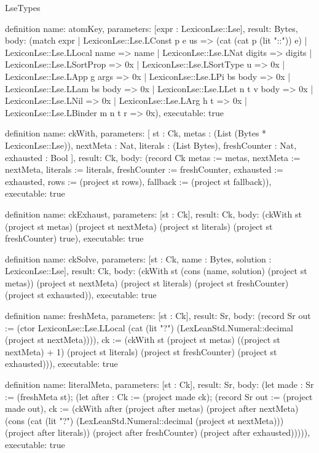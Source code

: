 \begin{lexlean}{LseTypes}
\begin{semanticmodule}
definition{
  name: atomKey,
  parameters: [expr : LexiconLse::Lse],
  result: Bytes,
  body: (match expr
    | LexiconLse::Lse.LConst p e us => (cat (cat p (lit "::")) e)
    | LexiconLse::Lse.LLocal name => name
    | LexiconLse::Lse.LNat digits => digits
    | LexiconLse::Lse.LSortProp => 0x
    | LexiconLse::Lse.LSortType u => 0x
    | LexiconLse::Lse.LApp g args => 0x
    | LexiconLse::Lse.LPi bs body => 0x
    | LexiconLse::Lse.LLam bs body => 0x
    | LexiconLse::Lse.LLet n t v body => 0x
    | LexiconLse::Lse.LNil => 0x
    | LexiconLse::Lse.LArg h t => 0x
    | LexiconLse::Lse.LBinder m n t r => 0x),
  executable: true
}

definition{
  name: ckWith,
  parameters: [
    st : Ck,
    metas : (List (Bytes * LexiconLse::Lse)),
    nextMeta : Nat,
    literals : (List Bytes),
    freshCounter : Nat,
    exhausted : Bool
  ],
  result: Ck,
  body: (record Ck {metas := metas, nextMeta := nextMeta, literals := literals, freshCounter := freshCounter, exhausted := exhausted, rows := (project st rows), fallback := (project st fallback)}),
  executable: true
}

definition{
  name: ckExhaust,
  parameters: [st : Ck],
  result: Ck,
  body: (ckWith st (project st metas) (project st nextMeta) (project st literals) (project st freshCounter) true),
  executable: true
}

definition{
  name: ckSolve,
  parameters: [st : Ck, name : Bytes, solution : LexiconLse::Lse],
  result: Ck,
  body: (ckWith st (cons (name, solution) (project st metas)) (project st nextMeta) (project st literals) (project st freshCounter) (project st exhausted)),
  executable: true
}

definition{
  name: freshMeta,
  parameters: [st : Ck],
  result: Sr,
  body: (record Sr {out := (ctor LexiconLse::Lse.LLocal (cat (lit "?") (LexLeanStd.Numeral::decimal (project st nextMeta)))), ck := (ckWith st (project st metas) ((project st nextMeta) + 1) (project st literals) (project st freshCounter) (project st exhausted))}),
  executable: true
}

definition{
  name: literalMeta,
  parameters: [st : Ck],
  result: Sr,
  body: (let made : Sr := (freshMeta st); (let after : Ck := (project made ck); (record Sr {out := (project made out), ck := (ckWith after (project after metas) (project after nextMeta) (cons (cat (lit "?") (LexLeanStd.Numeral::decimal (project st nextMeta))) (project after literals)) (project after freshCounter) (project after exhausted))}))),
  executable: true
}


\end{semanticmodule}
\end{lexlean}
